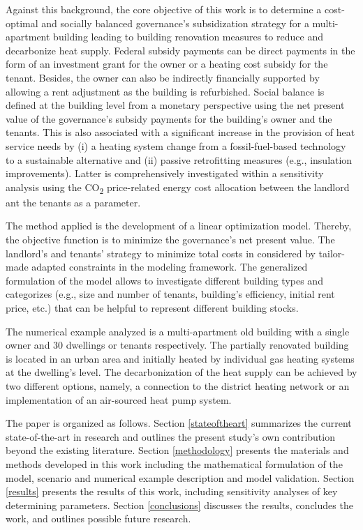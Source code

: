 Against this background, the core objective of this work is to determine a cost-optimal and socially balanced governance's subsidization strategy for a multi-apartment building leading to building renovation measures to reduce and decarbonize heat supply. Federal subsidy payments can be direct payments in the form of an investment grant for the owner or a heating cost subsidy for the tenant. Besides, the owner can also be indirectly financially supported by allowing a rent adjustment as the building is refurbished. Social balance is defined at the building level from a monetary perspective using the net present value of the governance's subsidy payments for the building's owner and the tenants. This is also associated with a significant increase in the provision of heat service needs by (i) a heating system change from a fossil-fuel-based technology to a sustainable alternative and (ii) passive retrofitting measures (e.g., insulation improvements). Latter is comprehensively investigated within a sensitivity analysis using the CO\textsubscript{2} price-related energy cost allocation between the landlord ant the tenants as a parameter.\vspace{0.5cm}

The method applied is the development of a linear optimization model. Thereby, the objective function is to minimize the governance's net present value. The landlord's and tenants' strategy to minimize total costs in considered by tailor-made adapted constraints in the modeling framework. The generalized formulation of the model allows to investigate different building types and categorizes (e.g., size and number of tenants, building's efficiency, initial rent price, etc.) that can be helpful to represent different building stocks.\vspace{0.5cm}

The numerical example analyzed is a multi-apartment old building with a single owner and 30 dwellings or tenants respectively. The partially renovated building is located in an urban area and initially heated by individual gas heating systems at the dwelling's level. The decarbonization of the heat supply can be achieved by two different options, namely, a connection to the district heating network or an implementation of an air-sourced heat pump system.\vspace{0.5cm}

The paper is organized as follows. Section \ref{stateoftheart} summarizes the current state-of-the-art in research and outlines the present study’s own contribution beyond the existing literature. Section \ref{methodology} presents the materials and methods developed in this work including the mathematical formulation of the model, scenario and numerical example description and model validation. Section \ref{results} presents the results of this work, including sensitivity analyses of key determining parameters. Section \ref{conclusions} discusses the results, concludes the work, and outlines possible future research.